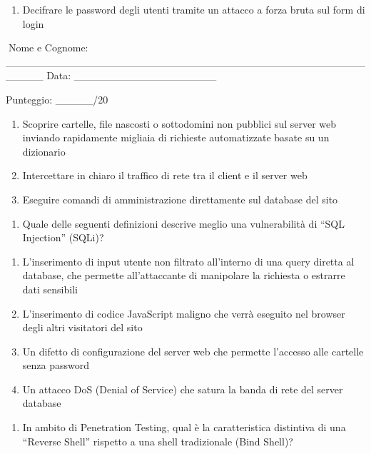 \documentclass[11pt,a4paper]{article}
\providecommand{\tightlist}{%
  \setlength{\itemsep}{0pt}\setlength{\parskip}{0pt}}
\begin{document}
\begin{enumerate}
\def\labelenumi{\Alph{enumi})}
\tightlist
\item
  Decifrare le password degli utenti tramite un attacco a forza bruta
  sul form di login
\end{enumerate}

Nome e Cognome:
\_\_\_\_\_\_\_\_\_\_\_\_\_\_\_\_\_\_\_\_\_\_\_\_\_\_\_\_\_\_\_\_\_\_\_\_\_\_\_\_\_\_\_\_\_\_\_\_\_\_\_\_\_
Data: \_\_\_\_\_\_\_\_\_\_\_\_\_\_\_\_\_\_\_

Punteggio: \_\_\_\_\_/20

\begin{enumerate}
\def\labelenumi{\Alph{enumi})}
\setcounter{enumi}{1}
\tightlist
\item
  Scoprire cartelle, file nascosti o sottodomini non pubblici sul server
  web inviando rapidamente migliaia di richieste automatizzate basate su
  un dizionario
\item
  Intercettare in chiaro il traffico di rete tra il client e il server
  web
\item
  Eseguire comandi di amministrazione direttamente sul database del sito
\end{enumerate}

\begin{enumerate}
\def\labelenumi{\arabic{enumi}.}
\setcounter{enumi}{14}
\tightlist
\item
  Quale delle seguenti definizioni descrive meglio una vulnerabilità di
  ``SQL Injection'' (SQLi)?
\end{enumerate}

\begin{enumerate}
\def\labelenumi{\Alph{enumi})}
\tightlist
\item
  L'inserimento di input utente non filtrato all'interno di una query
  diretta al database, che permette all'attaccante di manipolare la
  richiesta o estrarre dati sensibili
\item
  L'inserimento di codice JavaScript maligno che verrà eseguito nel
  browser degli altri visitatori del sito
\item
  Un difetto di configurazione del server web che permette l'accesso
  alle cartelle senza password
\item
  Un attacco DoS (Denial of Service) che satura la banda di rete del
  server database
\end{enumerate}

\begin{enumerate}
\def\labelenumi{\arabic{enumi}.}
\setcounter{enumi}{15}
\tightlist
\item
  In ambito di Penetration Testing, qual è la caratteristica distintiva
  di una ``Reverse Shell'' rispetto a una shell tradizionale (Bind
  Shell)?
\end{enumerate}
\end{document}
